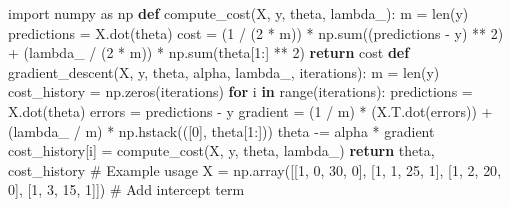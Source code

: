 \documentclass[
  letterpaper,
  DIV=11,
  numbers=noendperiod]{scrreprt}
\newenvironment{Shaded}{\begin{snugshade}}{\end{snugshade}}
\newcommand{\BuiltInTok}[1]{\textcolor[rgb]{0.00,0.23,0.31}{#1}}
\newcommand{\CommentTok}[1]{\textcolor[rgb]{0.37,0.37,0.37}{#1}}
\newcommand{\ControlFlowTok}[1]{\textcolor[rgb]{0.00,0.23,0.31}{\textbf{#1}}}
\newcommand{\DecValTok}[1]{\textcolor[rgb]{0.68,0.00,0.00}{#1}}
\newcommand{\ImportTok}[1]{\textcolor[rgb]{0.00,0.46,0.62}{#1}}
\newcommand{\KeywordTok}[1]{\textcolor[rgb]{0.00,0.23,0.31}{\textbf{#1}}}
\newcommand{\NormalTok}[1]{\textcolor[rgb]{0.00,0.23,0.31}{#1}}
\newcommand{\OperatorTok}[1]{\textcolor[rgb]{0.37,0.37,0.37}{#1}}
\begin{document}
\begin{Shaded}
\begin{Highlighting}[]
\ImportTok{import}\NormalTok{ numpy }\ImportTok{as}\NormalTok{ np}
\KeywordTok{def}\NormalTok{ compute\_cost(X, y, theta, lambda\_):}
\NormalTok{    m }\OperatorTok{=} \BuiltInTok{len}\NormalTok{(y)}
\NormalTok{    predictions }\OperatorTok{=}\NormalTok{ X.dot(theta)}
\NormalTok{    cost }\OperatorTok{=}\NormalTok{ (}\DecValTok{1} \OperatorTok{/}\NormalTok{ (}\DecValTok{2} \OperatorTok{*}\NormalTok{ m)) }\OperatorTok{*}\NormalTok{ np.}\BuiltInTok{sum}\NormalTok{((predictions }\OperatorTok{{-}}\NormalTok{ y) }\OperatorTok{**} \DecValTok{2}\NormalTok{) }\OperatorTok{+}\NormalTok{ (lambda\_ }\OperatorTok{/}\NormalTok{ (}\DecValTok{2} \OperatorTok{*}\NormalTok{ m)) }\OperatorTok{*}\NormalTok{ np.}\BuiltInTok{sum}\NormalTok{(theta[}\DecValTok{1}\NormalTok{:] }\OperatorTok{**} \DecValTok{2}\NormalTok{)}
    \ControlFlowTok{return}\NormalTok{ cost}
\KeywordTok{def}\NormalTok{ gradient\_descent(X, y, theta, alpha, lambda\_, iterations):}
\NormalTok{    m }\OperatorTok{=} \BuiltInTok{len}\NormalTok{(y)}
\NormalTok{    cost\_history }\OperatorTok{=}\NormalTok{ np.zeros(iterations)}
    \ControlFlowTok{for}\NormalTok{ i }\KeywordTok{in} \BuiltInTok{range}\NormalTok{(iterations):}
\NormalTok{         predictions }\OperatorTok{=}\NormalTok{ X.dot(theta)}
\NormalTok{         errors }\OperatorTok{=}\NormalTok{ predictions }\OperatorTok{{-}}\NormalTok{ y}
\NormalTok{         gradient }\OperatorTok{=}\NormalTok{ (}\DecValTok{1} \OperatorTok{/}\NormalTok{ m) }\OperatorTok{*}\NormalTok{ (X.T.dot(errors)) }\OperatorTok{+}\NormalTok{ (lambda\_ }\OperatorTok{/}\NormalTok{ m) }\OperatorTok{*}\NormalTok{ np.hstack(([}\DecValTok{0}\NormalTok{], theta[}\DecValTok{1}\NormalTok{:]))}
\NormalTok{         theta }\OperatorTok{{-}=}\NormalTok{ alpha }\OperatorTok{*}\NormalTok{ gradient}
\NormalTok{         cost\_history[i] }\OperatorTok{=}\NormalTok{ compute\_cost(X, y, theta, lambda\_)}
    \ControlFlowTok{return}\NormalTok{ theta, cost\_history}
\CommentTok{\# Example usage}
\NormalTok{X }\OperatorTok{=}\NormalTok{ np.array([[}\DecValTok{1}\NormalTok{, }\DecValTok{0}\NormalTok{, }\DecValTok{30}\NormalTok{, }\DecValTok{0}\NormalTok{], [}\DecValTok{1}\NormalTok{, }\DecValTok{1}\NormalTok{, }\DecValTok{25}\NormalTok{, }\DecValTok{1}\NormalTok{], [}\DecValTok{1}\NormalTok{, }\DecValTok{2}\NormalTok{, }\DecValTok{20}\NormalTok{, }\DecValTok{0}\NormalTok{], [}\DecValTok{1}\NormalTok{, }\DecValTok{3}\NormalTok{, }\DecValTok{15}\NormalTok{, }\DecValTok{1}\NormalTok{]])  }\CommentTok{\# Add intercept term}

\end{Highlighting}
\end{Shaded}
\end{document}
